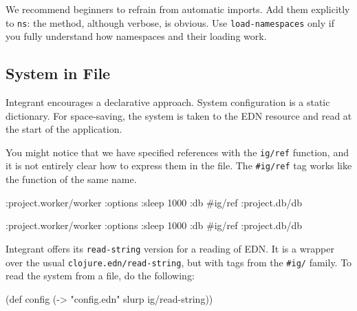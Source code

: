 We recommend beginners to refrain from automatic imports. Add them explicitly to \verb|ns|: the method, although verbose, is obvious. Use \verb|load-namespaces| only if you fully understand how namespaces and their loading work.

\subsection{System in File}


Integrant encourages a declarative approach. System configuration is a static dictionary. For space-saving, the system is taken to the EDN resource and read at the start of the application.


You might notice that we have specified references with the \verb|ig/ref| function, and it is not entirely clear how to express them in the file. The \verb|#ig/ref| tag works like the function of the same name.

\ifnarrow

\begin{english}
  \begin{clojure}
{:project.worker/worker
 {:options {:sleep 1000}
  :db #ig/ref :project.db/db}}
  \end{clojure}
\end{english}

\else

\begin{english}
  \begin{clojure}
{:project.worker/worker {:options {:sleep 1000}
                         :db #ig/ref :project.db/db}}
  \end{clojure}
\end{english}

\fi



Integrant offers its \verb|read-string| version for a reading of EDN. It is a wrapper over the usual \verb|clojure.edn/read-string|, but with tags from the \verb|#ig/| family. To read the system from a file, do the following:

\begin{english}
  \begin{clojure}
(def config
  (-> "config.edn" slurp ig/read-string))
  \end{clojure}
\end{english}

